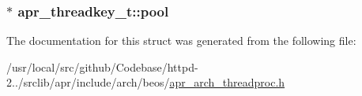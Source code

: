 \subsubsection[{\texorpdfstring{pool}{pool}}]{ $\ast$ apr\+\_\+threadkey\+\_\+t\+::pool}\hypertarget{structapr__threadkey__t_a400200f84ec2f8a160beaa933b6a8b2a}{}\label{structapr__threadkey__t_a400200f84ec2f8a160beaa933b6a8b2a}


The documentation for this struct was generated from the following file\+:\begin{DoxyCompactItemize}
\item 
/usr/local/src/github/\+Codebase/httpd-\/2../srclib/apr/include/arch/beos/\hyperlink{beos_2apr__arch__threadproc_8h}{apr\+\_\+arch\+\_\+threadproc.\+h}\end{DoxyCompactItemize}

